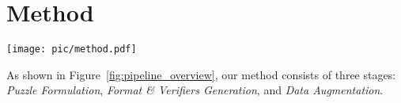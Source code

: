 \section{Method}
\begin{figure*}[t!]
    \centering
    \texttt{[image: pic/method.pdf]}
    \caption{An overview of our method. The process consists of three stages: \textbf{Stage 1} formulates logic puzzles by extracting background information and constraints from a source corpus. \textbf{Stage 2} uses large language models (LLMs) to generate verifiers, which are programs that check puzzle solutions and ensure correct formatting. \textbf{Stage 3} augments the puzzles by adding or removing constraints to create varying difficulty levels. All three stages leverage powerful LLMs, such as GPT-4, for generation. 
   }
    \label{fig:pipeline_overview}
\end{figure*}

As shown in Figure~\ref{fig:pipeline_overview}, our method consists of three stages:  \emph{Puzzle Formulation},  \emph{Format \& Verifiers Generation}, and  \emph{Data Augmentation}.





